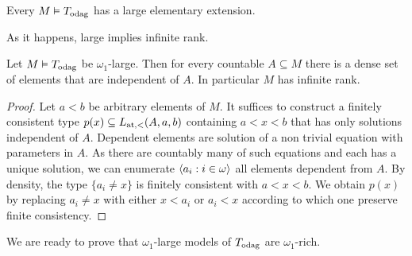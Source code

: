 





\begin{proposition}\label{prop_odag_large_exists}
  Every $M \models T_{\rm odag}$ has a large elementary extension.\QED 
\end{proposition}

As it happens, large implies infinite rank.

\begin{proposition}\label{prop_odag_ind_dense}
  Let $M\models T_{\rm odag}$ be $\omega_1$-large.
  Then for every countable $A\subseteq M$ there is a dense set of elements that are independent of $A$.
  In particular $M$ has infinite rank.
\end{proposition}

\begin{proof}
  Let $a<b$ be arbitrary elements of $M$.
  It suffices to construct a finitely consistent type $p(x)\subseteq L_{\rm at, <}(A,a,b)$ containing $a<x<b$ that has only solutions independent of $A$.
  Dependent elements are solution of a non trivial equation with parameters in $A$.
  As there are countably many of such equations and each has a unique solution, we can enumerate $\<a_i:i\in\omega\>$ all elements dependent from $A$.
  By density, the type $\{a_i\neq x\}$ is finitely consistent with  $a<x<b$.
  We obtain $p(x)$ by replacing $a_i\neq x$ with either $x<a_i$ or $a_i<x$ according to which one preserve finite consistency.
\end{proof}

We are ready to prove that $\omega_1$-large models of $T_{\rm odag}$ are $\omega_1$-rich.

